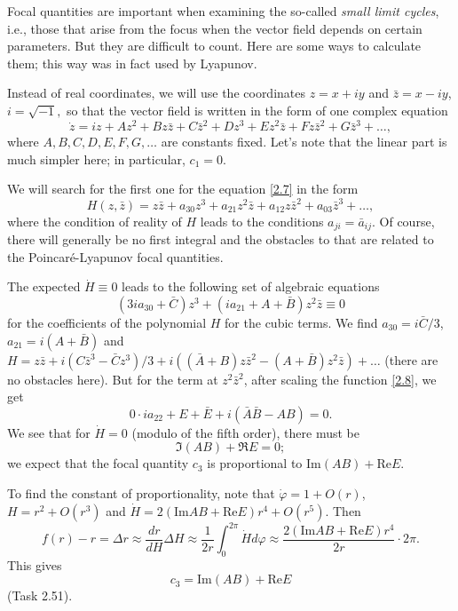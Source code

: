 \begin{remark}
	Focal quantities are important when examining the so-called \emph{small limit cycles}, i.e., those that arise from the focus when the vector field depends on certain parameters. But they are difficult to count. Here are some ways to calculate them; this way was in fact used by Lyapunov.
	
	Instead of real coordinates, we will use the coordinates $ z = x + iy $ and $ \bar {z} = x-iy $, $ i = \sqrt {-1}, $ so that the vector field is written in the form of one complex equation
	\begin{equation}
	\label{2.7}
	\dot{z}=iz+Az^{2}+Bz\bar{z}+C\bar{z}^{2}+Dz^{3}+Ez^{2}\bar{z}+Fz\bar{z}^{2}+G%
	\bar{z}^{3}+\ldots ,
	\end{equation}
	where $ A, B, C, D, E, F, G, \ldots $ are constants fixed. Let's note that the linear part is much simpler here; in particular, $ c_ {1} = 0 $.
	
	We will search for the first one for the equation \eqref{2.7} in the form
	\begin{equation}
	\label{2.8}
	H(z,\bar{z})=z\bar{z}+a_{30}z^{3}+a_{21}z^{2}\bar{z}+a_{12}z\bar{z}%
	^{2}+a_{03}\bar{z}^{3}+\ldots ,
	\end{equation}
	where the condition of reality of $H$ leads to the conditions $a_{ji}=\bar{a}
	_{ij}$. Of course, there will generally be no first integral and the obstacles to that are related to the Poincaré-Lyapunov focal quantities.
	
	The expected $ \dot {H} \equiv 0 $ leads to the following set of algebraic equations
	$$
	(3ia_{30}+\bar{C})z^{3}+(ia_{21}+A+\bar{B})z^{2}\bar{z}\equiv 0
	$$
	for the coefficients of the polynomial $ H $ for the cubic terms. We find $a_{30}=i\bar{C}/3$, $a_{21}=i(A+\bar{B})$ and $H=z\bar{z}	+i\left( C\bar{z}^{3}-\bar{C}z^{3}\right) /3+i\left( \left( \bar{A}+B\right)
	z\bar{z}^{2}-\left( A+\bar{B}\right) z^{2}\bar{z}\right) +\ldots $ (there are no obstacles here). But for the term at $ z ^ {2} \bar {z} ^ {2} $, after scaling the function \eqref{2.8}, we get
	$$
	0\cdot ia_{22}+E+\bar{E}+i(\bar{A}\bar{B}-AB)=0.
	$$
	We see that for $ \dot {H} = 0 $ (modulo of the fifth order), there must be 
	$$
	\Im(AB)+\Re E=0;
	$$
	we expect that the focal quantity $ c_ {3} $ is proportional to $ \textrm {Im} (AB) + \textrm {Re} E $.
	
	To find the constant of proportionality, note that $\dot{\varphi}=1+O(r)$, $H = r^{2}+O(r^{3})$ and
	$\dot{H}=2\left( \textrm{Im}AB+\textrm{Re}E\right) r^{4}+O(r^{5})$. Then
	$$
	f(r)-r=\Delta r\approx \frac{dr}{dH}\Delta H\approx \frac{1}{2r}%
	\int_{0}^{2\pi }\dot{H}d\varphi \approx \frac{2(\textrm{Im}AB+\textrm{Re}E)r^{4}%
	}{2r}\cdot 2\pi .
	$$
	This gives
	\begin{equation}
	\label{2.9}
	c_{3}=\textrm{Im}(AB)+\textrm{Re}E
	\end{equation}%
	(Task 2.51).
\end{remark}

